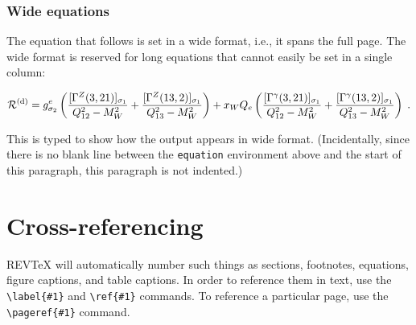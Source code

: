 \documentclass[%
 reprint,
 amsmath,amssymb,
 aps,
]{revtex4-2}
\begin{document}
  \subsubsection{Wide equations}
  The equation that follows is set in a wide format, i.e., it spans the full page. 
  The wide format is reserved for long equations
  that cannot easily be set in a single column:
  \begin{widetext}
    \begin{equation}
      {\cal R}^{(\text{d})}=
      g_{\sigma_2}^e
      \left(
        \frac{[\Gamma^Z(3,21)]_{\sigma_1}}{Q_{12}^2-M_W^2}
        +\frac{[\Gamma^Z(13,2)]_{\sigma_1}}{Q_{13}^2-M_W^2}
      \right)
      + x_WQ_e
      \left(
        \frac{[\Gamma^\gamma(3,21)]_{\sigma_1}}{Q_{12}^2-M_W^2}
        +\frac{[\Gamma^\gamma(13,2)]_{\sigma_1}}{Q_{13}^2-M_W^2}
      \right)\;. 
      \label{eq:wideeq}
    \end{equation}
  \end{widetext}
  This is typed to show how the output appears in wide format.
  (Incidentally, since there is no blank line between the \texttt{equation} environment above 
  and the start of this paragraph, this paragraph is not indented.)

  \section{Cross-referencing}
  REV\TeX{} will automatically number such things as
  sections, footnotes, equations, figure captions, and table captions. 
  In order to reference them in text, use the
  \verb+\label{#1}+ and \verb+\ref{#1}+ commands. 
  To reference a particular page, use the \verb+\pageref{#1}+ command.
\end{document}
